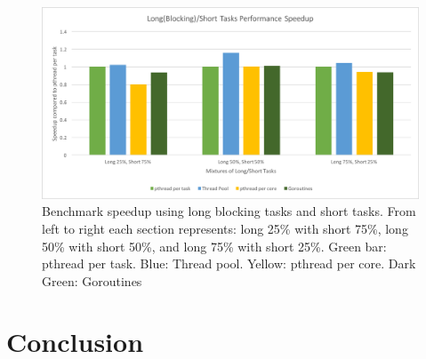 \documentclass[journal, a4paper]{IEEEtran}
\begin{document}
\begin{figure}[!hbt]
		\begin{center}
		\includegraphics[width=\columnwidth]{test_1.png}
		\caption{Benchmark speedup using long blocking tasks and short tasks. From left to right each section represents: long 25\% with short 75\%, long 50\% with short 50\%, and long 75\% with short 25\%. Green bar: pthread per task. Blue: Thread pool. Yellow: pthread per core. Dark Green: Goroutines}
		\label{fig:tf_plot}
		\end{center}
	\end{figure}

\section{Conclusion}



\end{document}
